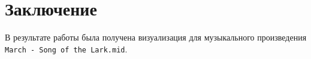 \chapter{Заключение}

В результате работы была получена визуализация для музыкального произведения \texttt{March - Song of the Lark.mid}.